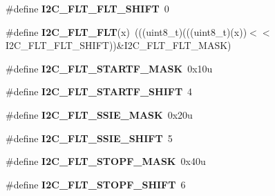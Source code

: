\begin{DoxyCompactItemize}
\item 
\#define {\bfseries I2\+C\+\_\+\+F\+L\+T\+\_\+\+F\+L\+T\+\_\+\+S\+H\+I\+FT}~0\hypertarget{group__I2C__Register__Masks_ga87c3021777b04e02f3c0481cdbde30e5}{}\label{group__I2C__Register__Masks_ga87c3021777b04e02f3c0481cdbde30e5}

\item 
\#define {\bfseries I2\+C\+\_\+\+F\+L\+T\+\_\+\+F\+LT}(x)~(((uint8\+\_\+t)(((uint8\+\_\+t)(x))$<$$<$I2\+C\+\_\+\+F\+L\+T\+\_\+\+F\+L\+T\+\_\+\+S\+H\+I\+FT))\&I2\+C\+\_\+\+F\+L\+T\+\_\+\+F\+L\+T\+\_\+\+M\+A\+SK)\hypertarget{group__I2C__Register__Masks_ga7a184e93601a1086484b0ac2752cab00}{}\label{group__I2C__Register__Masks_ga7a184e93601a1086484b0ac2752cab00}

\item 
\#define {\bfseries I2\+C\+\_\+\+F\+L\+T\+\_\+\+S\+T\+A\+R\+T\+F\+\_\+\+M\+A\+SK}~0x10u\hypertarget{group__I2C__Register__Masks_ga5957e41d1f413c45abde107e68d1f054}{}\label{group__I2C__Register__Masks_ga5957e41d1f413c45abde107e68d1f054}

\item 
\#define {\bfseries I2\+C\+\_\+\+F\+L\+T\+\_\+\+S\+T\+A\+R\+T\+F\+\_\+\+S\+H\+I\+FT}~4\hypertarget{group__I2C__Register__Masks_ga60596c41d1748a538e7e752c9b701bb3}{}\label{group__I2C__Register__Masks_ga60596c41d1748a538e7e752c9b701bb3}

\item 
\#define {\bfseries I2\+C\+\_\+\+F\+L\+T\+\_\+\+S\+S\+I\+E\+\_\+\+M\+A\+SK}~0x20u\hypertarget{group__I2C__Register__Masks_ga532d6e283f53b115820f6a20f4f442a8}{}\label{group__I2C__Register__Masks_ga532d6e283f53b115820f6a20f4f442a8}

\item 
\#define {\bfseries I2\+C\+\_\+\+F\+L\+T\+\_\+\+S\+S\+I\+E\+\_\+\+S\+H\+I\+FT}~5\hypertarget{group__I2C__Register__Masks_ga6fa677ac36d808e9e048d3ab81623f8c}{}\label{group__I2C__Register__Masks_ga6fa677ac36d808e9e048d3ab81623f8c}

\item 
\#define {\bfseries I2\+C\+\_\+\+F\+L\+T\+\_\+\+S\+T\+O\+P\+F\+\_\+\+M\+A\+SK}~0x40u\hypertarget{group__I2C__Register__Masks_ga49bb44800a0defc2dd1efb27263f7c52}{}\label{group__I2C__Register__Masks_ga49bb44800a0defc2dd1efb27263f7c52}

\item 
\#define {\bfseries I2\+C\+\_\+\+F\+L\+T\+\_\+\+S\+T\+O\+P\+F\+\_\+\+S\+H\+I\+FT}~6\hypertarget{group__I2C__Register__Masks_gae69dbb7d8bd1dff50e5c30846d3285bb}{}\label{group__I2C__Register__Masks_gae69dbb7d8bd1dff50e5c30846d3285bb}


\end{DoxyCompactItemize}
